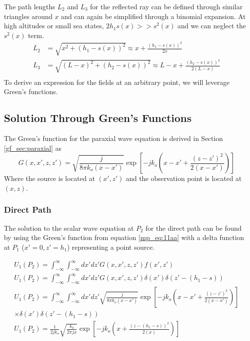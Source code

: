The path lengths  $L_2$ and $L_3$ for the reflected ray can be defined through similar triangles around $x$ and can again be simplified through a binomial expansion. At high altitudes or small sea states, $2h_1s(x) >> s^2(x)$ and we can neglect the $s^2(x)$ term.
\begin{equation}
\begin{aligned}
L_2 &= \sqrt{x^2 + \left( h_1 - s(x)\right)^2}  \approx x + \frac{(h_1-s(x))^2}{2x}\\
L_3 & = \sqrt{\left(L - x\right)^2 + \left( h_2 - s(x)\right)^2}  \approx L-x + \frac{(h_2 - s(x))^2}{2\left(L-x\right)}\\
\end{aligned}
\label{mp_eq:12}
\end{equation}
\renewcommand{\baselinestretch}{2} \small\normalsize
To derive an expression for the fields at an arbitrary point, we will leverage Green's functions.

\subsection{Solution Through Green's Functions}
The Green's function for the paraxial wave equation is derived in Section \ref{gf_sec:paraxial} as
\begin{equation}
G\left(x,x',z,z' \right)= \sqrt{\frac{j}{8\pi k_o(x-x')}}\exp\left[-jk_o\left(x -x' + \frac{(z-z')^2}{2(x-x')}\right) \right]
\label{mp_eq:11aa}
\end{equation}
\renewcommand{\baselinestretch}{2} \small\normalsize
Where the source is located at $(x',z')$ and the observation point is located at $(x,z)$.

\subsubsection{Direct Path}
The solution to the scalar wave equation at $P_2$ for the direct path can be found by using the Green's function from equation \ref{mp_eq:11aa} with a delta function at $P_1$ ($x' = 0, z' = h_1$) representing a point source.

\begin{equation}
\begin{gathered}
U_1(P_2) = \int_{-\infty}^{\infty} \int_{-\infty}^{\infty}dx' dz' G\left(x,x',z,z' \right) f(x',z') \\
U_1(P_2) = \int_{-\infty}^{\infty} \int_{-\infty}^{\infty}dx' dz' G\left(x,x',z,z' \right)\delta(x') \delta(z'- (h_1-s)) \\
U_1(P_2) = \int_{-\infty}^{\infty} \int_{-\infty}^{\infty}dx' dz' \sqrt{\frac{j}{8\pi k_o(x-x')}}\exp\left[-jk_o\left(x -x' + \frac{(z-z')^2}{2(x-x')}\right) \right] \\
\times \delta(x') \delta(z'- (h_1-s)) \\
U_1(P_2) = \frac{1}{2jk_o}\sqrt{\frac{k_o}{2\pi jx}}\exp\left[-jk_o\left(x + \frac{(z-(h_1-s))^2}{2(x)}\right) \right]\\
\end{gathered}
\label{mp_eq:11ab}
\end{equation}
\renewcommand{\baselinestretch}{2} \small\normalsize

